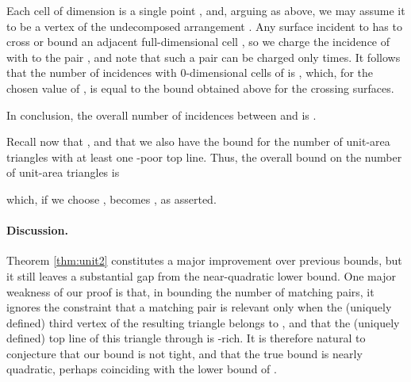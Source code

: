 \documentclass[12pt]{article}
\begin{document}
Each cell of dimension  is a single point , and, arguing as above,
we may assume it
to be a vertex of the undecomposed arrangement . Any surface
 incident to  has to cross or bound an adjacent
full-dimensional cell , so we charge the incidence of 
with  to the pair , and note that such a pair can
be charged only  times. It follows that the number of incidences
with 0-dimensional cells of  is ,
which, for the chosen value of , is equal to the bound obtained
above for the crossing surfaces.

In conclusion, the overall number of incidences between  and
 is .

Recall now that , and that we also have the bound 
for the number of unit-area triangles with at least one -poor
top line. Thus, the overall bound on the number of unit-area triangles
is

which, if we choose , becomes , as
asserted.


\paragraph{Discussion.}
Theorem \ref{thm:unit2} constitutes a major improvement over previous
bounds, but it still leaves a substantial gap from the near-quadratic
lower bound. One major weakness of our proof is that, in bounding the
number of matching pairs, it ignores the constraint that a matching
pair is relevant only when the (uniquely defined) third vertex  of
the resulting triangle belongs to , and that the (uniquely defined)
top line of this triangle through  is -rich. It is therefore
natural to conjecture that our bound is not tight, and that the true
bound is nearly quadratic, perhaps coinciding with the lower bound of
\cite{EP71}.
\end{document}
